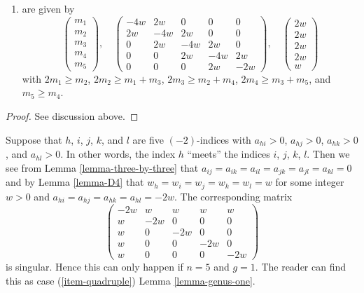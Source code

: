 \begin{lemma}
\begin{enumerate}
$$\begin{matrix}
w \\
w \\
2w
\end{matrix}
\right)
$$
with $2m_1 \geq m_2$, $2m_2 \geq m_1 + m_3$, $2m_3 \geq m_2 + m_4$,
$2m_4 \geq m_3 + 2m_5$, and $2m_5 \geq m_4$, or
\item
\label{item-B5}
are given by
$$
\left(
\begin{matrix}
m_1 \\
m_2 \\
m_3 \\
m_4 \\
m_5
\end{matrix}
\right),
\quad
\left(
\begin{matrix}
-4w & 2w & 0 & 0 & 0 \\
2w & -4w & 2w & 0 & 0 \\
0 & 2w & -4w & 2w & 0 \\
0 & 0 & 2w & -4w & 2w \\
0 & 0 & 0 & 2w & -2w
\end{matrix}
\right),
\quad
\left(
\begin{matrix}
2w \\
2w \\
2w \\
2w \\
w
\end{matrix}
\right)
$$
with $2m_1 \geq m_2$, $2m_2 \geq m_1 + m_3$, $2m_3 \geq m_2 + m_4$,
$2m_4 \geq m_3 + m_5$, and $m_5 \geq m_4$.
\end{enumerate}
\end{lemma}

\begin{proof}
See discussion above.
\end{proof}

\noindent
Suppose that $h$, $i$, $j$, $k$, and $l$ are five $(-2)$-indices
with $a_{hi} > 0$, $a_{hj} > 0$, $a_{hk} > 0$, and $a_{hl} > 0$.
In other words, the index $h$ ``meets'' the indices
$i$, $j$, $k$, $l$. Then we see from Lemma \ref{lemma-three-by-three}
that $a_{ij} = a_{ik} = a_{il} = a_{jk} = a_{jl} = a_{kl} = 0$ and
by Lemma \ref{lemma-D4} that
$w_h = w_i = w_j = w_k = w_l = w$ for some integer $w > 0$ and
$a_{hi} = a_{hj} = a_{hk} = a_{hl} = -2w$.
The corresponding matrix
$$
\left(
\begin{matrix}
-2w & w & w & w & w \\
w & -2w & 0 & 0 & 0 \\
w & 0 & -2w & 0 & 0 \\
w & 0 & 0 & -2w & 0 \\
w & 0 & 0 & 0 & -2w
\end{matrix}
\right)
$$
is singular. Hence this can only happen if $n = 5$ and $g = 1$.
The reader can find this as case
(\ref{item-quadruple}) Lemma \ref{lemma-genus-one}.

